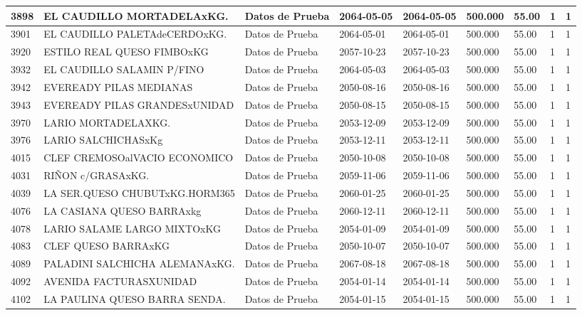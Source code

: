 \documentclass[a4paper,12pt]{article}
\begin{document}
\begin{landscape}
\begin{longtable}{|p{4cm}|p{2.5cm}|p{2.5cm}|p{1.8cm}|p{1.8cm}|p{1cm}|p{1cm}|p{3cm}|p{3cm}||}
3898 & EL CAUDILLO MORTADELAxKG. & Datos de Prueba & 2064-05-05 & 2064-05-05 & 500.000 & 55.00 & 1 & 1 \\ \hline 
3901 & EL CAUDILLO PALETAdeCERDOxKG. & Datos de Prueba & 2064-05-01 & 2064-05-01 & 500.000 & 55.00 & 1 & 1 \\ \hline 
3920 & ESTILO REAL QUESO FIMBOxKG & Datos de Prueba & 2057-10-23 & 2057-10-23 & 500.000 & 55.00 & 1 & 1 \\ \hline 
3932 & EL CAUDILLO SALAMIN P/FINO & Datos de Prueba & 2064-05-03 & 2064-05-03 & 500.000 & 55.00 & 1 & 1 \\ \hline 
3942 & EVEREADY PILAS MEDIANAS & Datos de Prueba & 2050-08-16 & 2050-08-16 & 500.000 & 55.00 & 1 & 1 \\ \hline 
3943 & EVEREADY PILAS GRANDESxUNIDAD & Datos de Prueba & 2050-08-15 & 2050-08-15 & 500.000 & 55.00 & 1 & 1 \\ \hline 
3970 & LARIO MORTADELAXKG. & Datos de Prueba & 2053-12-09 & 2053-12-09 & 500.000 & 55.00 & 1 & 1 \\ \hline 
3976 & LARIO SALCHICHASxKg & Datos de Prueba & 2053-12-11 & 2053-12-11 & 500.000 & 55.00 & 1 & 1 \\ \hline 
4015 & CLEF CREMOSOalVACIO ECONOMICO & Datos de Prueba & 2050-10-08 & 2050-10-08 & 500.000 & 55.00 & 1 & 1 \\ \hline 
4031 & RIÑON c/GRASAxKG. & Datos de Prueba & 2059-11-06 & 2059-11-06 & 500.000 & 55.00 & 1 & 1 \\ \hline 
4039 & LA SER.QUESO CHUBUTxKG.HORM365 & Datos de Prueba & 2060-01-25 & 2060-01-25 & 500.000 & 55.00 & 1 & 1 \\ \hline 
4076 & LA CASIANA QUESO BARRAxkg & Datos de Prueba & 2060-12-11 & 2060-12-11 & 500.000 & 55.00 & 1 & 1 \\ \hline 
4078 & LARIO SALAME LARGO MIXTOxKG & Datos de Prueba & 2054-01-09 & 2054-01-09 & 500.000 & 55.00 & 1 & 1 \\ \hline 
4083 & CLEF QUESO BARRAxKG & Datos de Prueba & 2050-10-07 & 2050-10-07 & 500.000 & 55.00 & 1 & 1 \\ \hline 
4089 & PALADINI SALCHICHA ALEMANAxKG. & Datos de Prueba & 2067-08-18 & 2067-08-18 & 500.000 & 55.00 & 1 & 1 \\ \hline 
4092 & AVENIDA FACTURASXUNIDAD & Datos de Prueba & 2054-01-14 & 2054-01-14 & 500.000 & 55.00 & 1 & 1 \\ \hline 
4102 & LA PAULINA QUESO BARRA SENDA. & Datos de Prueba & 2054-01-15 & 2054-01-15 & 500.000 & 55.00 & 1 & 1 \\ \hline 

\end{longtable}
\end{landscape}
\end{document}
